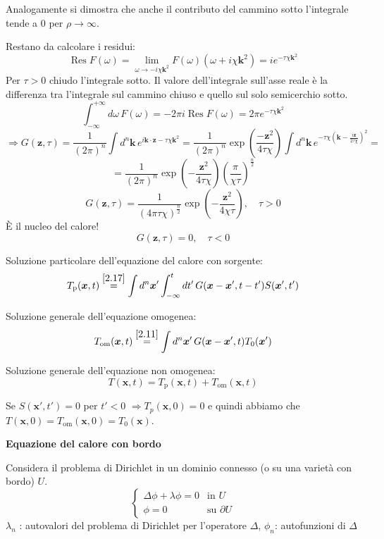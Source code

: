 \documentclass[a4paper,11pt]{report}
\newcommand{\x}{\boldsymbol{x}}
\newcommand{\kk}{\boldsymbol{k}}
\newcommand{\z}{\boldsymbol{z}}
\begin{document}
Analogamente si dimostra che anche il contributo del cammino sotto l'integrale tende a 0 per $\rho\to\infty$.

\thinspace

Restano da calcolare i residui:
\[
\operatorname{Res}F(\omega)=\lim_{\omega \to -i\chi \kk^2} F(\omega) (\omega + i\chi \kk^2)=ie^{-\tau\chi \kk ^2}
\]
Per $\tau>0$ chiudo l'integrale sotto. Il valore dell'integrale sull'asse reale \`e la differenza tra l'integrale sul cammino chiuso e quello sul solo semicerchio sotto.
\[
\int_{-\infty}^{+\infty}d\omega\, F(\omega)=-2\pi i \operatorname{Res}F(\omega)=2\pi e^{-\tau\chi\kk ^2}
\]
\[
\Rightarrow G(\z,\tau)=\frac{1}{(2\pi)^n}\int d^n\kk\, e^{i\kk\cdot \z-\tau\chi\kk ^2} =\frac{1}{(2\pi)^n}\exp\left(\frac{-\z^2}{4\tau\chi}\right) \int d^n\kk \, e^{-\tau\chi\left(\kk -\frac{i\z}{2\tau\chi}\right)^2}=
\]
\[
=\frac{1}{(2\pi)^n}\exp\left(-\frac{\z^2}{4\tau\chi}\right)\left( \frac{\pi}{\chi\tau} \right)^\frac{n}{2}
\]
\begin{equation}
G(\z,\tau)=\frac{1}{(4\pi\tau\chi)^\frac{n}{2}}\exp\left(-\frac{\z^2}{4\chi\tau}\right), \quad \tau>0
\end{equation}
\`E il nucleo del calore!
\begin{equation}
G(\z,\tau)=0,\quad \tau<0
\end{equation}

Soluzione particolare dell'equazione del calore con sorgente:
\[
T_\text{p}(\x,t)\overset{\eqref{2.17}}{=}\int d^n\x'\int_{-\infty}^{t}dt'\,G(\x-\x',t-t')S(\x',t')
\]

Soluzione generale dell'equazione omogenea:
\[
T_\text{om}(\x,t)\overset{\eqref{2.11}}{=}\int d^n\x'\,G(\x-\x',t)T_0(\x')
\]

Soluzione generale dell'equazione non omogenea:
\[
T(\x,t)=T_\text{p}(\x,t)+T_\text{om}(\x,t)
\]

Se $S(\x',t')=0$ per $t'<0$ $\Rightarrow T_p(\x,0)=0$ e quindi abbiamo che $T(\x,0)=T_\text{om}(\x,0)=T_0(\x)$.

\medskip

\textbf{Equazione del calore con bordo}

Considera il problema di Dirichlet in un dominio connesso (o su una variet\`a con bordo) $U$.
\[
\begin{cases}
\Delta \phi + \lambda\phi =0 & \text{in } U \\
\phi=0 & \text{su }\partial U
\end{cases}
\]
$\lambda_n$ : autovalori del problema di Dirichlet per l'operatore $\Delta$, $\phi_n$: autofunzioni di $\Delta$
\end{document}
